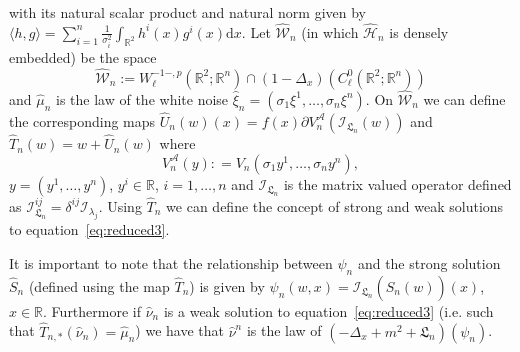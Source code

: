 \documentclass[a4paper,10pt]{article}
\newcommand{\assign}{:=}
\newcommand{\asterisk}{\mathord{*}}
\newcommand{\mathd}{\mathrm{d}}
\begin{document}
with its natural scalar product and natural norm given by $\langle h, g
\rangle = \sum_{i = 1}^n \frac{1}{\sigma_i^2} \int_{\mathbb{R}^2} h^i (x) g^i
(x) \mathd x$. Let $\widehat{\mathcal{W}}_n$ (in which
$\widehat{\mathcal{H}}_n$ is densely embedded) be the space
\[ \widehat{\mathcal{W}}_n \assign W^{- 1 -, p}_{\ell} (\mathbb{R}^2 ;
   \mathbb{R}^n) \cap (1 - \Delta_x) (C^0_{\ell} (\mathbb{R}^2 ;
   \mathbb{R}^n)) \]
and $\hat{\mu}_n$ is the law of the white noise $\hat{\xi}_n = (\sigma_1
\xi^1, \ldots, \sigma_n \xi^n)$. On $\widehat{\mathcal{W}}_n$ we can define
the corresponding maps $\hat{U}_n (w) (x) = f (x) \partial V^{\mathcal{A}}_n
(\mathcal{I}_{\mathfrak{L}_n} (w))$ and $\hat{T}_n (w) = w + \hat{U}_n (w)$
where
\[ V^{\mathcal{A}}_n (y) : = V_n (\sigma_1 y^1, \ldots, \sigma_n y^n), \]
$y = (y^1, \ldots, y^n)$, $y^i \in \mathbb{R}$, $i = 1, \ldots, n$ and
$\mathcal{I}_{\mathfrak{L}_n}$ is the matrix valued operator defined as
$\mathcal{I}_{\mathfrak{L}_n}^{i j} = \delta^{i j} \mathcal{I}_{\lambda_j}$.
Using $\hat{T}_n$ we can define the concept of strong and weak solutions to
equation~{\eqref{eq:reduced3}}.

\begin{remark}
  It is important to note that the relationship between $\psi_n$ and the
  strong solution $\hat{S}_n$ (defined using the map $\hat{T}_n$) is given by
  $\psi_n (w, x) = \mathcal{} \mathcal{I}_{\mathfrak{L}_n} (\hat{S}_n (w))
  (x)$, $x \in \mathbb{R}$. Furthermore if $\hat{\nu}_n$ is a weak solution to
  equation~{\eqref{eq:reduced3}} (i.e. such that $\hat{T}_{n, \asterisk}
  (\hat{\nu}_n) = \hat{\mu}_n$) we have that $\hat{\nu}^n$ is the law of $(-
  \Delta_x + m^2 + \mathfrak{L}_n) (\psi_n)$.
\end{remark}
\end{document}
